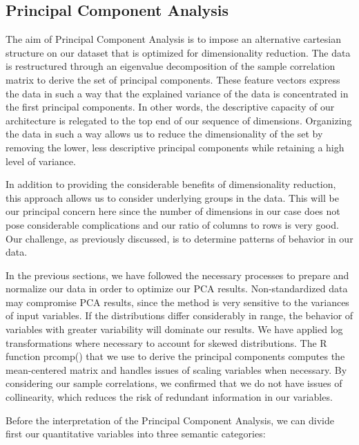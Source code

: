 \documentclass[
]{article}
\begin{document}
\newpage

\hypertarget{principal-component-analysis}{%
\subsection{Principal Component
Analysis}\label{principal-component-analysis}}

The aim of Principal Component Analysis is to impose an alternative
cartesian structure on our dataset that is optimized for dimensionality
reduction. The data is restructured through an eigenvalue decomposition
of the sample correlation matrix to derive the set of principal
components. These feature vectors express the data in such a way that
the explained variance of the data is concentrated in the first
principal components. In other words, the descriptive capacity of our
architecture is relegated to the top end of our sequence of dimensions.
Organizing the data in such a way allows us to reduce the dimensionality
of the set by removing the lower, less descriptive principal components
while retaining a high level of variance.

In addition to providing the considerable benefits of dimensionality
reduction, this approach allows us to consider underlying groups in the
data. This will be our principal concern here since the number of
dimensions in our case does not pose considerable complications and our
ratio of columns to rows is very good. Our challenge, as previously
discussed, is to determine patterns of behavior in our data.

In the previous sections, we have followed the necessary processes to
prepare and normalize our data in order to optimize our PCA results.
Non-standardized data may compromise PCA results, since the method is
very sensitive to the variances of input variables. If the distributions
differ considerably in range, the behavior of variables with greater
variability will dominate our results. We have applied log
transformations where necessary to account for skewed distributions. The
R function prcomp() that we use to derive the principal components
computes the mean-centered matrix and handles issues of scaling
variables when necessary. By considering our sample correlations, we
confirmed that we do not have issues of collinearity, which reduces the
risk of redundant information in our variables.

Before the interpretation of the Principal Component Analysis, we can
divide first our quantitative variables into three semantic categories:
\end{document}
